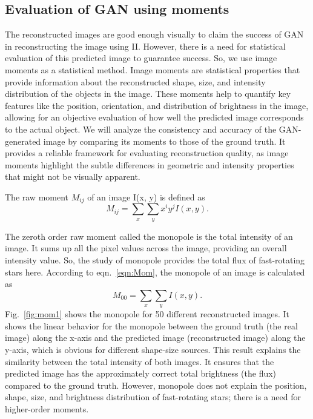 \subsection{Evaluation of GAN using moments}
The reconstructed images are good enough visually to claim the success of GAN in reconstructing the image using II. However, there is a need for statistical evaluation of this predicted image to guarantee success. So, we use image moments as a statistical method. Image moments are statistical properties that provide information about the reconstructed shape, size, and intensity distribution of the objects in the image. These moments help to quantify key features like the position, orientation, and distribution of brightness in the image, allowing for an objective evaluation of how well the predicted image corresponds to the actual object. We will analyze the consistency and accuracy of the GAN-generated image by comparing its moments to those of the ground truth. It provides a reliable framework for evaluating reconstruction quality, as image moments highlight the subtle differences in geometric and intensity properties that might not be visually apparent. 

The raw moment $M_{ij}$ of an image I(x, y) is defined as \citep{hu1962visual}
\begin{equation}
	M_{ij} = \sum_{x} \sum_{y} x^i y^j I(x, y).
	\label{eqn:Mom}
\end{equation}

The zeroth order raw moment called the monopole is the total intensity of an image. It sums up all the pixel values across the image, providing an overall intensity value. So, the study of monopole provides the total flux of fast-rotating stars here. According to eqn.~\ref{eqn:Mom}, the monopole of an image is calculated as 
\begin{equation}
	M_{00} = \sum_{x} \sum_{y} I(x, y).
\end{equation}
Fig.~\ref{fig:mom1} shows the monopole for 50 different reconstructed images. It shows the linear behavior for the monopole between the ground truth (the real image) along the x-axis and the predicted image (reconstructed image) along the y-axis, which is obvious for different shape-size sources. This result explains the similarity between the total intensity of both images. It ensures that the predicted image has the approximately correct total brightness (the flux) compared to the ground truth. However, monopole does not explain the position, shape, size, and brightness distribution of fast-rotating stars; there is a need for higher-order moments.

